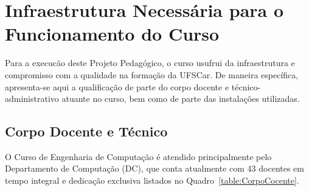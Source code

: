 
\section {Infraestrutura Necessária para o Funcionamento do Curso}

Para a execucão deste Projeto Pedagógico, o curso usufrui da infraestrutura e compromisso com a qualidade na formação da UFSCar. De maneira específica, apresenta-se aqui a qualificação de parte do corpo docente e técnico-administrativo atuante no curso, bem como de parte das instalações utilizadas.

\subsection{Corpo Docente e Técnico}

O Curso de Engenharia de Computação é atendido principalmente pelo Departamento de Computação (DC), que conta atualmente com 43 docentes em tempo integral e dedicação exclusiva listados no Quadro~\ref{table:CorpoCocente}.

